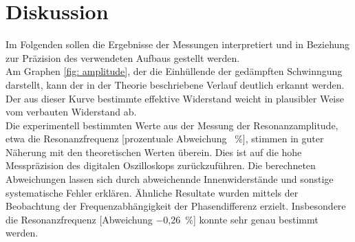 \section{Diskussion}
Im Folgenden sollen die Ergebnisse der Messungen interpretiert und in Beziehung zur Präzision des verwendeten Aufbaus gestellt werden. \\
Am Graphen \ref{fig: amplitude}, der die Einhüllende der gedämpften Schwinngung darstellt, kann der in der Theorie beschriebene Verlauf deutlich erkannt werden.
Der aus dieser Kurve bestimmte effektive Widerstand weicht in plausibler Weise vom verbauten Widerstand ab.\\
Die experimentell bestimmten Werte aus der Messung der Resonanzamplitude, etwa die Resonanzfrequenz [prozentuale Abweichung \SI{}{\%}],
stimmen in guter Näherung mit den theoretischen Werten überein. Dies ist auf die hohe Messpräzision des digitalen Oszilloskops zurückzuführen.
Die berechneten Abweichungen lassen sich durch abweichennde Innenwiderstände und sonstige systematische Fehler erklären. Ähnliche Resultate
wurden mittels der Beobachtung der Frequenzabhängigkeit der Phasendifferenz erzielt. Insbesondere die Resonanzfrequenz [Abweichung \SI{−0,26}{\%}] konnte
sehr genau bestimmt werden. 
